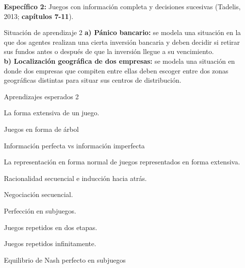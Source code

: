 \documentclass[11pt]{article}
\newenvironment{tight_enumerate}{
	\begin{enumerate}
		\setlength{\itemsep}{0pt}
		\setlength{\parskip}{0pt}
	}{\end{enumerate}}
\begin{document}
\begin{tcolorbox}[colback=bluerow!60]
	\textbf{Específico 2: }
		Juegos con información completa y decisiones sucesivas (Tadelis, 2013; \textbf{capítulos 7-11}).
	\begin{mybox}[colback=redrow!80]{Situación de aprendizaje 2}
		\textbf{a)	Pánico bancario:} se modela una situación en la que dos agentes realizan una cierta inversión bancaria y deben decidir si retirar sus fundos antes o después de que la inversión llegue a su vencimiento.\\
		\textbf{b)	Localización geográfica de dos empresas:} se modela una situación en donde dos empresas que compiten entre ellas deben escoger entre dos zonas geográficas distintas para situar sus centros de distribución.
		
	\end{mybox}
	
	\begin{mybox}[colback=purplerow!80]{Aprendizajes esperados 2}
		\begin{tight_enumerate}
			\item La forma extensiva de un juego. 
			\item Juegos en forma de árbol 
			\item Información perfecta vs información imperfecta 
			\item La representación en forma normal de juegos representados en forma extensiva. 
			\item Racionalidad secuencial e inducción hacia atrás. 
			\item Negociación secuencial. 
			\item Perfección en subjuegos. 
			\item Juegos repetidos en dos etapas. 
			\item Juegos repetidos infinitamente. 
			\item Equilibrio de Nash perfecto en subjuegos
			
		\end{tight_enumerate}
	\end{mybox}
\end{tcolorbox}
\end{document}
